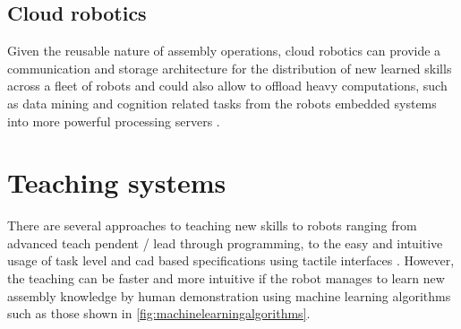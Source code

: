 \subsection{Cloud robotics}

Given the reusable nature of assembly operations, cloud robotics can provide a communication and storage architecture for the distribution of new learned skills across a fleet of robots \cite{Tenorth2013} and could also allow to offload heavy computations, such as data mining \cite{Witten2005} and cognition related tasks \cite{Beetz2010,Tenorth2013k,Saxena2014,Beetz2015} from the robots embedded systems into more powerful processing servers \cite{Hunziker2013}.




\section{Teaching systems}

There are several approaches to teaching new skills to robots ranging from advanced teach pendent / lead through programming, to the easy and intuitive usage of task level and \gls{cad} based specifications using tactile interfaces \cite{Perzylo2015a}. However, the teaching can be faster and more intuitive if the robot manages to learn new assembly knowledge \cite{tensorflow} by human demonstration \cite{Argall2009,Hamabe2015,Wang2015} using machine learning algorithms such as those shown in \cref{fig:machinelearningalgorithms}.

